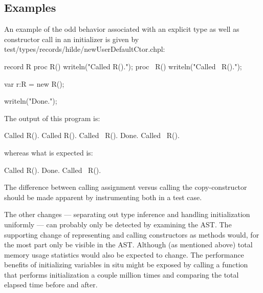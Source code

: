 \subsection{Examples}

An example of the odd behavior associated with an explicit type as well as constructor
call in an initializer is given by test/types/records/hilde/newUserDefaultCtor.chpl:
\begin{chapel}
record R
{
  proc R() { writeln("Called R()."); }
  proc ~R() { writeln("Called ~R()."); }
}

var r:R = new R();

writeln("Done.");
\end{chapel}
The output of this program is:
\begin{chapelprintoutput}
Called R().
Called R().
Called ~R().
Done.
Called ~R().
\end{chapelprintoutput}
\noindent
whereas what is expected is:
\begin{chapelprintoutput}
Called R().
Done.
Called ~R().
\end{chapelprintoutput}


The difference between calling assignment versus calling the copy-constructor should be
made apparent by instrumenting both in a test case.

The other changes --- separating out type inference and handling initialization uniformly
--- can probably only be detected by examining the AST.  The supporting change of
representing and calling constructors as methods would, for the most part only be visible
in the AST.  Although (as mentioned above) total memory usage statistics would also be
expected to change.  The performance benefits of initializing variables in situ might be
exposed by calling a function that performs initialization a couple million times and
comparing the total elapsed time before and after.

